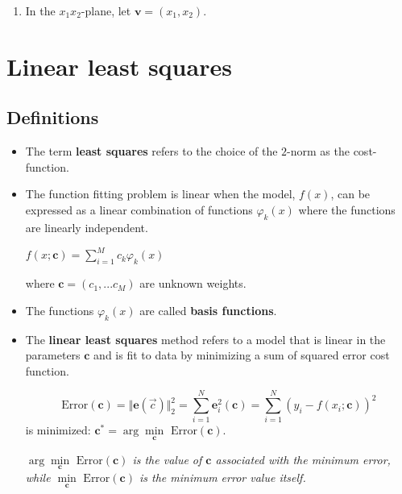 \documentclass[12pt,letterpaper,noanswers]{exam}
\begin{document}
\begin{enumerate}[resume]
\item In the $x_1x_2$-plane, let  $\mathbf{v}=(x_1,x_2)$.  

\end{enumerate}


\section{Linear least squares}





\subsection{Definitions}
\begin{tcolorbox}
\begin{itemize}
\itemsep0pt
    \item The term \textbf{least squares} refers to the choice of the $2$-norm as the cost-function.
    \item The function fitting problem is linear when the model, $f(x)$, can be expressed as a linear combination of functions $\varphi_k(x)$ where the functions are linearly independent.
    
    $\displaystyle f(x; \mathbf{c}) = \sum\limits_{i=1}^M c_k \varphi_k(x)$
    
    where $\mathbf{c} = (c_1,...c_M)$ are unknown weights.
    \item The functions $\varphi_k(x)$ are called \textbf{basis functions}.
    \item The \textbf{linear least squares} method refers to a model that is linear in the parameters $\mathbf{c}$ and is fit to data by minimizing a sum of squared error cost function.
    
    \[\text{Error}(\mathbf{c}) = \Vert \mathbf{e}(\vec{c})\Vert_2^2 = \sum\limits_{i=1}^N \mathbf{e}_i^2(\mathbf{c}) = \sum\limits_{i=1}^N \left(y_i - f(x_i; \mathbf{c})\right)^2\] is minimized: $\mathbf{c}^* = \arg\min\limits_{\mathbf{c}} \text{ Error}(\mathbf{c}).$
    
    \emph{$\arg\min\limits_{\mathbf{c}} \text{ Error}(\mathbf{c})$ is the value of $\mathbf{c}$ associated with the minimum error, while $\min\limits_{\mathbf{c}} \text{ Error}(\mathbf{c})$ is the minimum error value itself.}
\end{itemize}

\end{tcolorbox}
\end{document}
